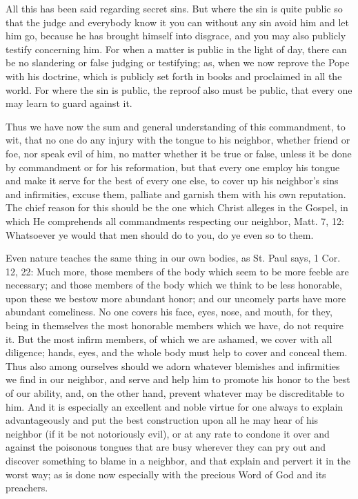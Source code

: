 All this has been said regarding secret sins. But where the sin is
quite public so that the judge and everybody know it you can without
any sin avoid him and let him go, because he has brought himself into
disgrace, and you may also publicly testify concerning him. For when a
matter is public in the light of day, there can be no slandering or
false judging or testifying; as, when we now reprove the Pope with his
doctrine, which is publicly set forth in books and proclaimed in all
the world. For where the sin is public, the reproof also must be
public, that every one may learn to guard against it.

Thus we have now the sum and general understanding of this
commandment, to wit, that no one do any injury with the tongue to his
neighbor, whether friend or foe, nor speak evil of him, no matter
whether it be true or false, unless it be done by commandment or for
his reformation, but that every one employ his tongue and make it serve
for the best of every one else, to cover up his neighbor's sins and
infirmities, excuse them, palliate and garnish them with his own
reputation. The chief reason for this should be the one which Christ
alleges in the Gospel, in which He comprehends all commandments
respecting our neighbor, Matt. 7, 12: Whatsoever ye would that men
should do to you, do ye even so to them.

Even nature teaches the same thing in our own bodies, as St. Paul
says, 1 Cor. 12, 22: Much more, those members of the body which seem to
be more feeble are necessary; and those members of the body which we
think to be less honorable, upon these we bestow more abundant honor;
and our uncomely parts have more abundant comeliness. No one covers his
face, eyes, nose, and mouth, for they, being in themselves the most
honorable members which we have, do not require it. But the most infirm
members, of which we are ashamed, we cover with all diligence; hands,
eyes, and the whole body must help to cover and conceal them. Thus also
among ourselves should we adorn whatever blemishes and infirmities we
find in our neighbor, and serve and help him to promote his honor to
the best of our ability, and, on the other hand, prevent whatever may
be discreditable to him. And it is especially an excellent and noble
virtue for one always to explain advantageously and put the best
construction upon all he may hear of his neighbor (if it be not
notoriously evil), or at any rate to condone it over and against the
poisonous tongues that are busy wherever they can pry out and discover
something to blame in a neighbor, and that explain and pervert it in
the worst way; as is done now especially with the precious Word of God
and its preachers.

